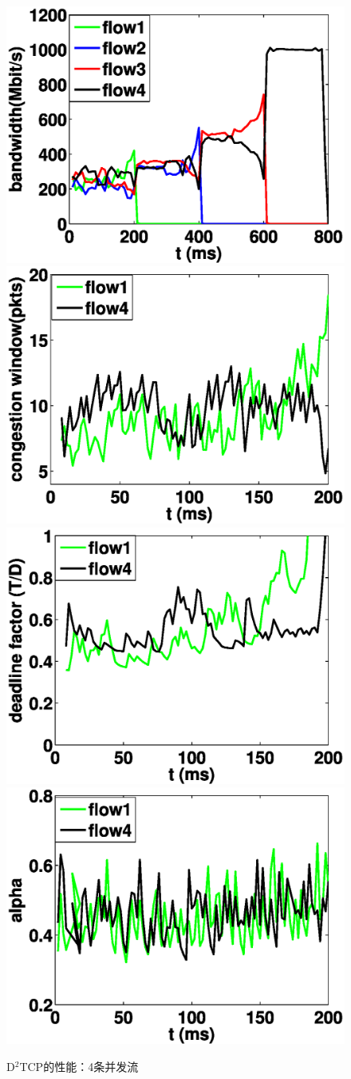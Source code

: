 \begin{figure}[h]
\setlength{\abovecaptionskip}{0pt} 
\setlength{\belowcaptionskip}{1pt} 
  \centering%
    {\includegraphics[width=0.5\columnwidth]{figures/LPD/bandwidth.eps}}%
      {\includegraphics[width=0.5\columnwidth]{figures/LPD/cwnd.eps}}
    {\includegraphics[width=0.5\columnwidth]{figures/LPD/deadlinefactor.eps}}%
      {\includegraphics[width=0.5\columnwidth]{figures/LPD/alpha.eps}}
  \caption{D$^2$TCP的性能：4条并发流}
  \label{LPD_Motivation}
\end{figure}

